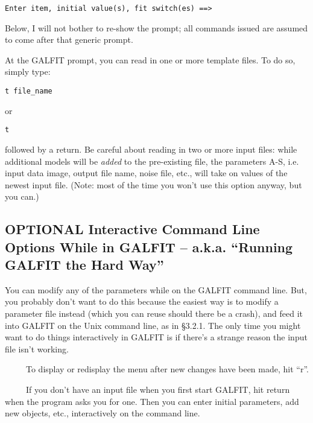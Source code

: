 \documentclass[preprint]{aastex}
\begin{document}
\footnotesize
\begin{verbatim}
Enter item, initial value(s), fit switch(es) ==>
\end{verbatim}
\normalsize

\noindent Below, I will not bother to re-show the prompt; all commands
issued are assumed to come after that generic prompt.

At the GALFIT prompt, you can read in one or more template files.  To do so,
simply type:

\begin {verbatim}
t file_name
\end {verbatim}

\noindent or 

\begin {verbatim}
t
\end{verbatim}

\noindent followed by a return.  Be careful about reading in two or more input
files:  while additional models will be {\it added} to the pre-existing file,
the parameters A-S, i.e. input data image, output file name, noise file, etc.,
will take on values of the newest input file.  (Note:  most of the time you
won't use this option anyway, but you can.)

\subsection {OPTIONAL Interactive Command Line Options While in GALFIT --
a.k.a.  ``Running GALFIT the Hard Way''}


You can modify any of the parameters while on the GALFIT command line.  But,
you probably don't want to do this because the easiest way is to modify a
parameter file instead (which you can reuse should there be a crash), and feed
it into GALFIT on the Unix command line, as in \S 3.2.1.  The only time you
might want to do things interactively in GALFIT is if there's a strange
reason the input file isn't working.

\bigskip

 \ \ \ \ \ To display or redisplay the
menu after new changes have been made, hit ``r''.

\bigskip

 \ \ \ \ \ If you don't have an input file when you first start
GALFIT, hit return when the program asks you for one.  Then you can enter
initial parameters, add new objects, etc., interactively on the command line.
\end{document}
